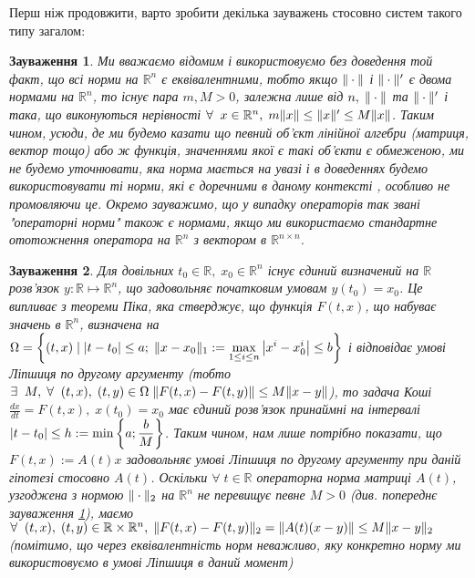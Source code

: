 \documentclass[14pt]{extarticle} %
\let\oldforall\forall
\renewcommand{\forall}{\oldforall\;}
\let\oldexists\exists
\renewcommand{\exists}{\oldexists\;}
\newtheorem{remark}{Зауваження}
\begin{document}
Перш ніж продовжити, варто зробити декілька зауважень стосовно систем такого типу загалом:
\begin{remark}\label{AllNormsAreEqRemark}
	Ми вважаємо відомим і використовуємо без доведення той факт, що всі норми на $\mathbb{R}^n$ є еквівалентними,
	тобто якщо $\|\cdot\|$ і $\|\cdot\|'$ є двома нормами на $\mathbb{R}^n$, то існує пара $m,M>0$, залежна
	лише від $n,\;\|\cdot\|$ та $\|\cdot\|'$ і така, що виконуються нерівності $\forall x\in\mathbb{R}^n,\;m\mynorm{x}\leq
	\mynorm{x}'\leq M\mynorm{x}$. Таким чином, усюди, де ми будемо казати що певний об’єкт лінійної алгебри (матриця, вектор тощо) або ж
	функція, значеннями якої є такі об’єкти є обмеженою, ми не будемо уточнювати, яка норма мається на увазі і в доведеннях будемо 
	використовувати ті норми, які є доречними в даному контексті
	, особливо не промовляючи це. Окремо зауважимо, що у випадку операторів так звані "операторні норми" також
	є нормами, якщо ми використаємо стандартне ототожнення оператора на $\mathbb{R}^n$ з вектором в $\mathbb{R}^{n\times n}$.
\end{remark}
\begin{remark}\label{SolsExistAndUniqRemark}
	Для довільних $t_0\in\mathbb{R},\;x_0\in\mathbb{R}^n$ існує єдиний визначений на 
$\mathbb{R}$ розв'язок $y:\mathbb{R}\mapsto\mathbb{R}^n$, що задовольняє початковим умовам $y(t_0)=x_0$.
Це випливає з теореми Піка, яка стверджує, що функція $F(t,x)$, що набуває значень в $\mathbb{R}^n$, визначена на 
$\Omega=\left\{(t,x) \mid \myabs{t-t_0}\leq a;\;\mynorm{x-x_0}_1:=\max_{1\leq i\leq n}\myabs{x^i-x^i_0}\leq b\right\}$ і відповідає умові Ліпшиця по другому аргументу (тобто 
$\exists M,\;\forall (t,x),\;(t,y)\in\Omega\;\mynorm{F(t,x)-F(t,y)}\leq M\mynorm{x-y}$), то задача Коші $\frac{dx}{dt}=F(t,x),\;x(t_0)=x_0$
має єдиний розв’язок принаймні на інтервалі $\myabs{t-t_0}\leq h:=\min\left\{a;\frac{b}{M}\right\}$. Таким чином, нам лише потрібно показати,
що $F(t,x):=A(t)x$ задовольняє умові Ліпшиця по другому аргументу при даній гіпотезі стосовно $A(t)$. Оскільки $\forall t\in\mathbb{R}$
операторна норма матриці $A(t)$, узгоджена з нормою $\|\cdot\|_2$ на $\mathbb{R}^n$ не перевищує певне $M>0$
(див. попереднє зауваження \ref{AllNormsAreEqRemark}), маємо 
$\forall (t,x),\;(t,y)\in\mathbb{R}\times\mathbb{R}^n,\;\mynorm{F(t,x)-F(t,y)}_2=\mynorm{A(t)(x-y)}\leq M\mynorm{x-y}_2$ (помітимо,
що через еквівалентність норм неважливо, яку конкретно норму ми використовуємо в умові Ліпшиця в даний момент)
\end{remark}
\end{document}
